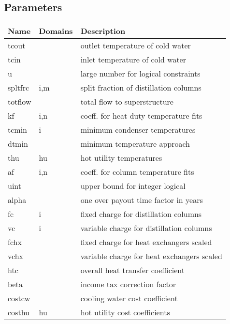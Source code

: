 \documentclass[11pt]{article}
\begin{document}
\subsection*{Parameters}
\begin{tabularx}{\textwidth}{| l | l | X |}
\hline
\textbf{Name} & \textbf{Domains} & \textbf{Description}\\
\hline
\endhead

tcout &  & outlet temperature of cold water\\
tcin &  & inlet temperature of cold water\\
u &  & large number for logical constraints\\
spltfrc & i,m & split fraction of distillation columns\\
totflow &  & total flow to superstructure\\
kf & i,n & coeff. for heat duty temperature fits\\
tcmin & i & minimum condenser temperatures\\
dtmin &  & minimum temperature approach\\
thu & hu & hot utility temperatures\\
af & i,n & coeff. for column temperature fits\\
uint &  & upper bound for integer logical\\
alpha &  & one over payout time factor in years\\
fc & i & fixed charge for distillation columns\\
vc & i & variable charge for distillation columns\\
fchx &  & fixed charge for heat exchangers scaled\\
vchx &  & variable charge for heat exchangers scaled\\
htc &  & overall heat transfer coefficient\\
beta &  & income tax correction factor\\
costcw &  & cooling water cost coefficient\\
costhu & hu & hot utility cost coefficients\\
\hline
\end{tabularx}
\end{document}
